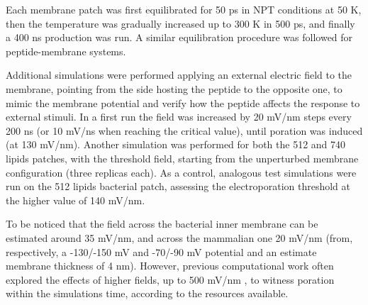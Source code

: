 Each membrane patch was first equilibrated for 50 ps in NPT conditions at 50 K, then the temperature was gradually increased up to 300 K in 500 ps, and finally a 400 ns production was run. A similar equilibration procedure was followed for peptide-membrane systems.

Additional simulations were performed applying an external electric field to the membrane, pointing from the side hosting the peptide to the opposite one, to mimic the membrane potential and verify how the peptide affects the response to external stimuli.
%
In a first run the field was increased by 20 mV/nm steps every 200 ns (or 10 mV/ns when reaching the critical value), until poration was induced (at 130 mV/nm).
%
Another simulation was performed for both the 512 and 740 lipids patches, with the threshold field, starting from the unperturbed membrane configuration (three replicas each).
%
As a control, analogous test simulations were run on the 512 lipids bacterial patch, assessing the electroporation threshold at the higher value of 140 mV/nm.

To be noticed that the field across the bacterial inner membrane can be estimated around 35 mV/nm, and across the mammalian one 20 mV/nm (from, respectively, a -130/-150 mV and -70/-90 mV potential \citep{Yeaman2003,Wilson2011} and an estimate membrane thickness of 4 nm). However, previous computational work often explored the effects of higher fields, up to 500 mV/nm \citep{Tieleman2004, Bockmann2008, Piggot2011}, to witness poration within the simulations time, according to the resources available.

